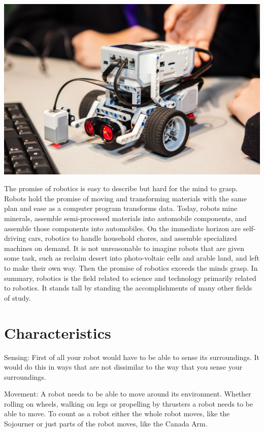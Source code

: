 \documentclass{fisatproject}
\begin{document}
\begin{center}
\includegraphics[scale=.2]{robo.png}
\end{center}

The promise of robotics is easy to describe but hard for the mind to grasp. Robots hold the promise of moving and transforming materials with the same plan and ease as a computer program transforms data. Today, robots mine minerals, assemble semi-processed materials into automobile components, and assemble those components into automobiles. On the immediate horizon are self-driving cars, robotics to handle household chores, and assemble specialized machines on demand.\cite{i,b,c} It is not unreasonable to imagine robots that are given some task, such as reclaim desert into photo-voltaic cells and arable land, and left to make their own way. Then the promise of robotics exceeds the minds grasp.\newline
In summary, robotics is the field related to science and technology primarily related to robotics. It stands tall by standing the accomplishments of many other fields of study.


\section{Characteristics}
Sensing: First of all your robot would have to be able to sense its surroundings. It would do this in ways that are not dissimilar to the way that you sense your surroundings.
\vspace{1cm}

Movement: A robot needs to be able to move around its environment. Whether rolling on wheels, walking on legs or propelling by thrusters a robot needs to be able to move. To count as a robot either the whole robot moves, like the Sojourner or just parts of the robot moves, like the Canada Arm.
\vspace{1cm}
\end{document}
